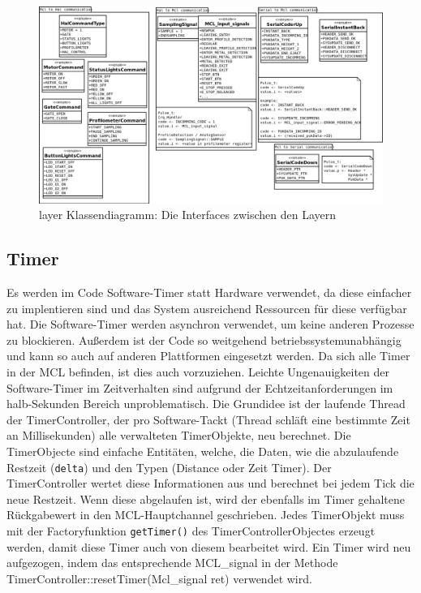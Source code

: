 \documentclass[
   draft=false
  ,paper=a4
  ,twoside=true
  ,fontsize=11pt
  ,headsepline
  ,DIV11
  ,parskip=full+
]{scrartcl} %
\begin{document}
\begin{figure}[htp]
  	\centering
    \includegraphics[width=\textwidth]{./IMG/interLayerCom.png}
    \caption[layer]{layer Klassendiagramm: Die Interfaces zwischen den Layern}
     \label{fig:layer}
\end{figure}
\newline

\subsection{Timer}
Es werden im Code Software-Timer statt Hardware verwendet, da diese einfacher zu implentieren sind und das System ausreichend Ressourcen für diese verfügbar hat. Die Software-Timer werden asynchron verwendet, um keine anderen Prozesse zu blockieren. Außerdem ist der Code so weitgehend betriebssystemunabhängig und kann so auch auf anderen Plattformen eingesetzt werden. Da sich alle Timer in der MCL befinden, ist dies auch vorzuziehen. Leichte Ungenauigkeiten der Software-Timer im Zeitverhalten sind aufgrund der Echtzeitanforderungen im halb-Sekunden Bereich unproblematisch.
\newline
Die Grundidee ist der laufende Thread der TimerController, der pro Software-Tackt (Thread schläft eine bestimmte Zeit an Millisekunden) alle verwalteten TimerObjekte, neu berechnet. Die TimerObjecte sind einfache Entitäten, welche, die Daten, wie die abzulaufende Restzeit (\texttt{delta}) und den Typen (Distance oder Zeit Timer). 
Der TimerController wertet diese Informationen aus und berechnet bei jedem Tick die neue Restzeit. Wenn diese abgelaufen ist, wird der ebenfalls im Timer gehaltene Rückgabewert in den MCL-Hauptchannel geschrieben.
Jedes TimerObjekt muss mit der Factoryfunktion \texttt{getTimer()} des TimerControllerObjectes erzeugt werden, damit diese Timer auch von diesem bearbeitet wird. Ein Timer wird neu aufgezogen, indem das entsprechende MCL\_signal in der Methode TimerController::resetTimer(Mcl\_signal ret) verwendet wird. 
\end{document}
